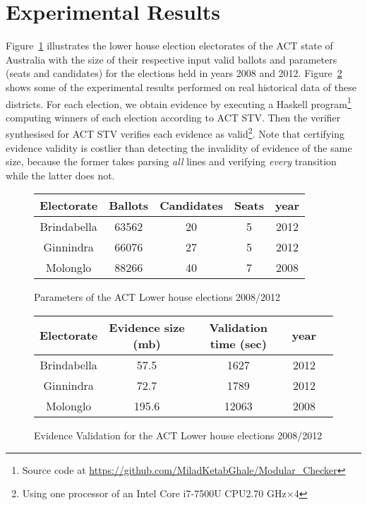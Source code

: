\documentclass[10pt,conference]{IEEEtran}
\begin{document}
\section{Experimental Results}

Figure~\ref{ParamACT} illustrates the lower house election electorates of the ACT state of Australia with the size of their respective input valid ballots and parameters (seats and candidates) for the elections held in years 2008 and 2012. Figure~\ref{EvACT} shows some of the experimental results performed on real historical data of these districts. For each election, we obtain evidence  by executing a Haskell program\footnote{Source code at \url{https://github.com/MiladKetabGhale/Modular_Checker}} computing winners of each election  according to ACT STV. Then the verifier synthesised for 
 ACT STV verifies each evidence as valid\footnote{Using one processor of an Intel Core i7-7500U CPU\@ 2.70 GHz$\times$4}. Note that certifying evidence  validity is costlier than detecting the invalidity of evidence of the same size, because the former takes parsing  \emph{all} lines and verifying \emph{every} transition  while the latter does not. 
\begin{figure}[t]
\centering
\begin{small}
\begin{tabular}{|c | c | c | c | c|}
\hline
Electorate&Ballots&Candidates&Seats&year\\
\hline
Brindabella&63562&20&5&2012\\
\hline
Ginnindra&66076&27&5&2012\\
\hline
Molonglo&88266&40&7&2008\\
\hline
\end{tabular}
\end{small}
\caption{Parameters of the ACT Lower house elections 2008/2012} 
\label{ParamACT}
\end{figure}
\begin{figure}[h]
\centering
\begin{small}
\begin{tabular}{|c | c | c | c | c|}
\hline
Electorate&Evidence size (mb)&Validation time (sec)&year\\
\hline
Brindabella&57.5&1627&2012\\
\hline
Ginnindra&72.7&1789&2012\\
\hline
Molonglo&195.6&12063&2008\\
\hline
\end{tabular}
\end{small}
\caption{Evidence Validation for the ACT Lower house elections 2008/2012}
\label{EvACT} 
\end{figure}
\end{document}
